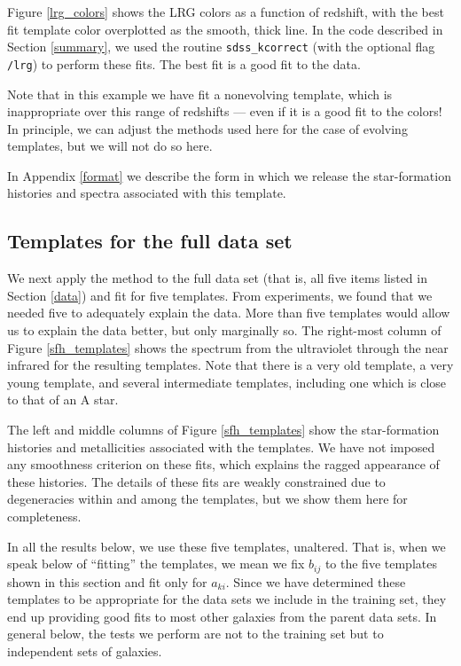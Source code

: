 \documentclass[10pt,preprint]{aastex}
\begin{document}
Figure \ref{lrg_colors} shows the LRG colors as a function of
redshift, with the best fit template color overplotted as the smooth,
thick line. In the code described in Section \ref{summary}, we used the
routine {\tt sdss\_kcorrect} (with the optional flag {\tt /lrg}) to
perform these fits. The best fit is a good fit to the data.

Note that in this example we have fit a nonevolving template, which is
inappropriate over this range of redshifts --- even if it is a good
fit to the colors! In principle, we can adjust the methods used here
for the case of evolving templates, but we will not do so here.

In Appendix \ref{format} we describe the form in which we release 
the star-formation histories and spectra associated with this
template.

\subsection{Templates for the full data set}

We next apply the method to the full data set (that is, all five items
listed in Section \ref{data}) and fit for five templates. From
experiments, we found that we needed five to adequately explain the
data. More than five templates would allow us to explain the data
better, but only marginally so.  The right-most column of Figure
\ref{sfh_templates} shows the spectrum from the ultraviolet through
the near infrared for the resulting templates. Note that there is a
very old template, a very young template, and several intermediate
templates, including one which is close to that of an A star.

The left and middle columns of Figure \ref{sfh_templates} show the
star-formation histories and metallicities associated with the
templates. We have not imposed any smoothness criterion on these fits,
which explains the ragged appearance of these histories.  The details
of these fits are weakly constrained due to degeneracies within and
among the templates, but we show them here for completeness.

In all the results below, we use these five templates, unaltered. That
is, when we speak below of ``fitting'' the templates, we mean we fix
$b_{ij}$ to the five templates shown in this section and fit only for
$a_{ki}$. Since we have determined these templates to be appropriate
for the data sets we include in the training set, they end up
providing good fits to most other galaxies from the parent data sets.
In general below, the tests we perform are not to the training set but
to independent sets of galaxies.
\end{document}
